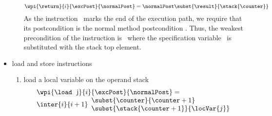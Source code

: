 \begin{itemize}
\begin{enumerate}
 $$\wpi{\return}{i}{\excPost}{\normalPost}  = \normalPost \subst{ \result }{\stack{\counter}}$$
 As the instruction \return \ marks the end of the execution path, we require that its postcondition is the normal method postcondition \normalPost.
 Thus, the weakest precondition of the instruction is \normalPost \ where the specification variable \result \  is substituted with the stack top
 element.

\end{enumerate}






\item  load and store instructions
	\begin{enumerate}
		\item load a local variable on the operand stack \\
		 $$ \begin{array}{l}
                          \wpi{\load \  \mbox{ \rm j}} {i} {\excPost}{\normalPost}  =  \\
			  \inter{i}{i+1}\begin{array}{l} 
                                              \subst{\counter}{\counter +1} \\
					      \subst{  \stack{ \counter  + 1}}{\locVar{j}} 
					\end{array}
                    \end{array} $$ 
                

\end{enumerate}
\end{itemize}
